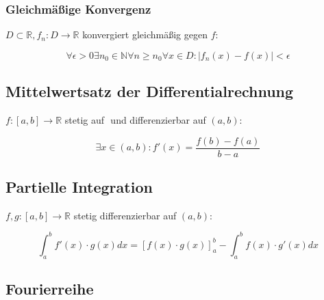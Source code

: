 \documentclass[twoside]{article}
\begin{document}
			\subsubsection{Gleichmäßige Konvergenz}
				
				\begin{math} D \subset \mathbb{R}, f_n: D \to \mathbb{R} \end{math} konvergiert gleichmäßig gegen \begin{math} f \end{math}:
				
				\begin{displaymath}
				\forall \epsilon > 0 \exists n_0 \in \mathbb{N} \forall n \geq n_0 \forall x \in D : |f_n(x) - f(x)| < \epsilon
				\end{displaymath} 
		
		\subsection{Mittelwertsatz der Differentialrechnung}
		
			\begin{math} f: [a,b] \to \mathbb{R} \end{math} stetig auf \begin{math} [a,b] \end{math} und differenzierbar auf \begin{math} (a,b) \end{math}:
			
			\begin{displaymath}
				\exists x \in (a,b):f'(x) = \frac{f(b) - f(a)}{b - a}
			\end{displaymath}
	
		\subsection{Partielle Integration}
			\begin{math} f, g: [a, b] \to \mathbb{R} \end{math} stetig differenzierbar auf \begin{math} (a,b) \end{math}:
			
			\begin{displaymath}
				\int_{a}^{b} f'(x) \cdot g(x) dx = [f(x) \cdot g(x)]_{a}^{b} - \int_{a}^{b} f(x) \cdot g'(x) dx
			\end{displaymath}
		
		\subsection{Fourierreihe}
		
\end{document}
